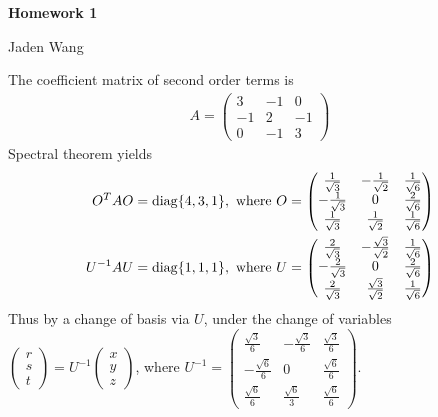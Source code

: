 \documentclass[12pt]{article}
\begin{document}
\centerline {\textsf{\textbf{\LARGE{Homework 1}}}}
\centerline {Jaden Wang}
\vspace{.15in}

\begin{problem}[1.4.3]
The coefficient matrix of second order terms is
\begin{align*}
	A = \begin{pmatrix} 3&-1&0\\-1&2&-1\\0&-1&3 \end{pmatrix} 
\end{align*}
Spectral theorem yields
\begin{align*}
	O^{T}AO &= \operatorname{diag} \{4,3,1\}, \text{ where } O = \begin{pmatrix} \frac{1}{\sqrt{3} }& -\frac{1}{\sqrt{2} }& \frac{1}{\sqrt{6} }\\-\frac{1}{\sqrt{3} } & 0 & \frac{2}{\sqrt{6} }\\ \frac{1}{\sqrt{3} }& \frac{1}{\sqrt{2} } & \frac{1}{\sqrt{6} } \end{pmatrix}    \\
	U^{-1}AU &= \operatorname{diag} \{1,1,1\}, \text{ where } U = \begin{pmatrix} \frac{2}{\sqrt{3} }& -\frac{\sqrt{3} }{\sqrt{2} }& \frac{1}{\sqrt{6} }\\-\frac{2}{\sqrt{3} } & 0 & \frac{2}{\sqrt{6} }\\ \frac{2}{\sqrt{3} }& \frac{\sqrt{3} }{\sqrt{2} } & \frac{1}{\sqrt{6} } \end{pmatrix}  \\
\end{align*}
Thus by a change of basis via $ U$, under the change of variables  $ \begin{pmatrix} r\\s\\t \end{pmatrix}  =U^{-1} \begin{pmatrix} x\\y\\z \end{pmatrix}  $, where $ U^{-1} = \begin{pmatrix} \frac{\sqrt{3} }{6 }& - \frac{\sqrt{3} }{ 6}& \frac{\sqrt{3} }{ 6} \\ - \frac{\sqrt{6} }{ 6}&0& \frac{\sqrt{6} }{ 6}\\ \frac{\sqrt{6} }{ 6} & \frac{\sqrt{6} }{ 3} & \frac{\sqrt{6} }{ 6}  \end{pmatrix} $.


\end{problem}
\end{document}

